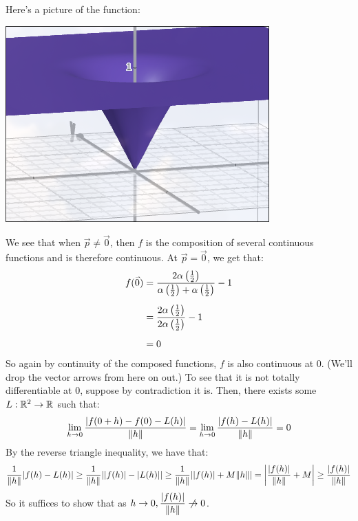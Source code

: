 \documentclass{article}
\begin{document}
\begin{soln}
    Here's a picture of the function: \vsp

    \centering
    \includegraphics[width=0.3\linewidth]{figures/sinkhole.png}
    \flushleft

    We see that when $ \vec p \neq \vec{0} $, then $ f $ is the composition of several
    continuous functions and is therefore continuous. At $ \vec{p} = \vec{0} $, we get that:
    \begin{align*}
        f(\vec{0}) & = \frac{2\alpha\left(\frac{1}{2}\right)}
        {\alpha\left( \frac{1}{2}\right)
        + \alpha\left( \frac{1}{2} \right)} - 1 \vsp
                   & = \frac{2\alpha \left( \frac{1}{2} \right)}
                   {2\alpha \left( \frac{1}{2} \right)} - 1 \vsp
                   & = 0
    \end{align*}
    So again by continuity of the composed functions, $ f $ is also continuous at $ 0 $. \vsp
    (We'll drop the vector arrows from here on out.)
    To see that it is not totally differentiable at $ 0 $, suppose by contradiction it is.
    Then, there exists some $ L : \mathbb{R}^{2} \rightarrow \mathbb{R} $ such that:
    \begin{equation*}
        \lim_{h \rightarrow 0} \frac{\abs{f(0 + h) - f(0) - L(h)}} {\|h\|}
        = \lim_{h \rightarrow 0} \frac{\abs{f(h) - L(h)}}{\|h\|} = 0
    \end{equation*}
    By the reverse triangle inequality, we have that:
    \begin{equation*}
        \frac{1}{\|h\|}\abs{f(h) - L(h)} \geq \frac{1}{\|h\|}\abs{\abs{f(h)} - \abs{L(h)}}
        \geq \frac{1}{\|h\|}\abs{\abs{f(h)} + M\|h\|} = \abs{\frac{\abs{f(h)}}{\|h\|} + M}
        \geq \frac{\abs{f(h)}}{\|h\|}
    \end{equation*}
    So it suffices to show that as $ h \rightarrow 0, \dfrac{\abs{f(h)}}{\norm{h}}
    \cnot\rightarrow 0 $.
    \newpage


\end{soln}
\end{document}
